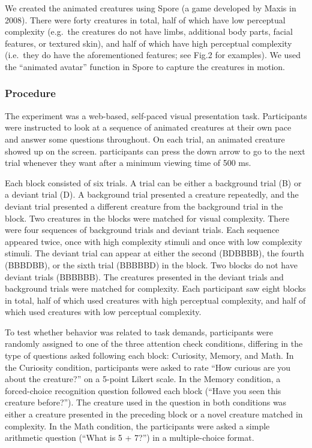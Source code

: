 \documentclass[10pt, letterpaper]{article}
\begin{document}
We created the animated creatures using Spore (a game developed by Maxis
in 2008). There were forty creatures in total, half of which have low
perceptual complexity (e.g.~the creatures do not have limbs, additional
body parts, facial features, or textured skin), and half of which have
high perceptual complexity (i.e.~they do have the aforementioned
features; see Fig.2 for examples). We used the ``animated avatar''
function in Spore to capture the creatures in motion.

\hypertarget{procedure}{%
\subsubsection{Procedure}\label{procedure}}

The experiment was a web-based, self-paced visual presentation task.
Participants were instructed to look at a sequence of animated creatures
at their own pace and answer some questions throughout. On each trial,
an animated creature showed up on the screen. participants can press the
down arrow to go to the next trial whenever they want after a minimum
viewing time of 500 ms.

Each block consisted of six trials. A trial can be either a background
trial (B) or a deviant trial (D). A background trial presented a
creature repeatedly, and the deviant trial presented a different
creature from the background trial in the block. Two creatures in the
blocks were matched for visual complexity. There were four sequences of
background trials and deviant trials. Each sequence appeared twice, once
with high complexity stimuli and once with low complexity stimuli. The
deviant trial can appear at either the second (BDBBBB), the fourth
(BBBDBB), or the sixth trial (BBBBBD) in the block. Two blocks do not
have deviant trials (BBBBBB). The creatures presented in the deviant
trials and background trials were matched for complexity. Each
participant saw eight blocks in total, half of which used creatures with
high perceptual complexity, and half of which used creatures with low
perceptual complexity.

To test whether behavior was related to task demands, participants were
randomly assigned to one of the three attention check conditions,
differing in the type of questions asked following each block:
Curiosity, Memory, and Math. In the Curiosity condition, participants
were asked to rate ``How curious are you about the creature?'' on a
5-point Likert scale. In the Memory condition, a forced-choice
recognition question followed each block (``Have you seen this creature
before?''). The creature used in the question in both conditions was
either a creature presented in the preceding block or a novel creature
matched in complexity. In the Math condition, the participants were
asked a simple arithmetic question (``What is 5 + 7?'') in a
multiple-choice format.
\end{document}
